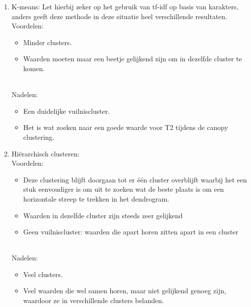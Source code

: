 \begin{enumerate}
\item K-means: Let hierbij zeker op het gebruik van tf-idf op basis van karakters, anders geeft deze methode in deze situatie heel verschillende resultaten.
\\\indent
Voordelen:
\begin{itemize}
    \item Minder clusters.
    \item Waarden moeten maar een beetje gelijkend zijn om in dezelfde cluster te komen.
\end{itemize}
\\\indent
Nadelen:
\begin{itemize}
    \item Een duidelijke vuilniscluster.
    \item Het is wat zoeken naar een goede waarde voor T2 tijdens de canopy clustering.
\end{itemize}

\item Hiërarchisch clusteren:
\\\indent
Voordelen:
\begin{itemize}
    \item Deze clustering blijft doorgaan tot er één cluster overblijft waarbij het een stuk eenvoudiger is om uit te zoeken wat de beste plaats is om een horizontale streep te trekken in het dendrogram.
    \item Waarden in dezelfde cluster zijn steeds zeer gelijkend
    \item Geen vuilniscluster: waarden die apart horen zitten apart in een cluster
\end{itemize}
\\\indent
Nadelen:
\begin{itemize}
    \item Veel clusters.
    \item Veel waarden die wel samen horen, maar niet gelijkend genoeg zijn, waardoor ze in verschillende clusters belanden.
\end{itemize}

\end{enumerate}


\\\indent

